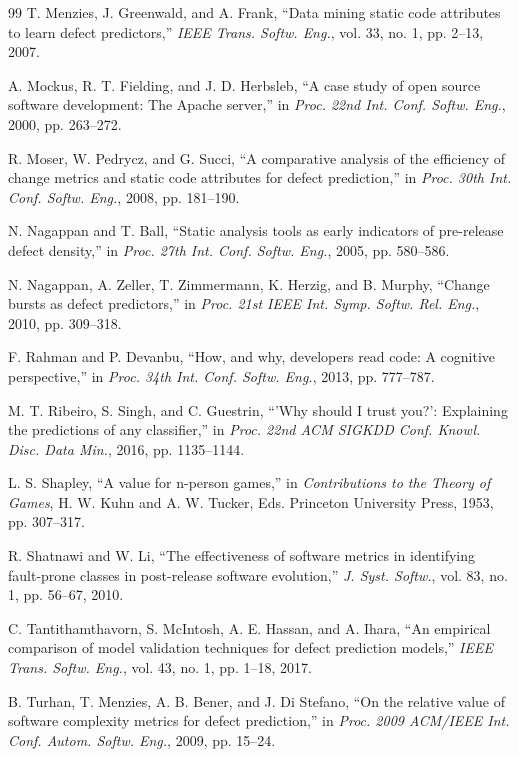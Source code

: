 \documentclass[conference]{IEEEtran}
\begin{document}
\begin{thebibliography}{99}
 T. Menzies, J. Greenwald, and A. Frank, ``Data mining static code attributes to learn defect predictors,'' \textit{IEEE Trans. Softw. Eng.}, vol. 33, no. 1, pp. 2--13, 2007.

 A. Mockus, R. T. Fielding, and J. D. Herbsleb, ``A case study of open source software development: The Apache server,'' in \textit{Proc. 22nd Int. Conf. Softw. Eng.}, 2000, pp. 263--272.

 R. Moser, W. Pedrycz, and G. Succi, ``A comparative analysis of the efficiency of change metrics and static code attributes for defect prediction,'' in \textit{Proc. 30th Int. Conf. Softw. Eng.}, 2008, pp. 181--190.

 N. Nagappan and T. Ball, ``Static analysis tools as early indicators of pre-release defect density,'' in \textit{Proc. 27th Int. Conf. Softw. Eng.}, 2005, pp. 580--586.

 N. Nagappan, A. Zeller, T. Zimmermann, K. Herzig, and B. Murphy, ``Change bursts as defect predictors,'' in \textit{Proc. 21st IEEE Int. Symp. Softw. Rel. Eng.}, 2010, pp. 309--318.

 F. Rahman and P. Devanbu, ``How, and why, developers read code: A cognitive perspective,'' in \textit{Proc. 34th Int. Conf. Softw. Eng.}, 2013, pp. 777--787.

 M. T. Ribeiro, S. Singh, and C. Guestrin, ``'Why should I trust you?': Explaining the predictions of any classifier,'' in \textit{Proc. 22nd ACM SIGKDD Conf. Knowl. Disc. Data Min.}, 2016, pp. 1135--1144.

 L. S. Shapley, ``A value for n-person games,'' in \textit{Contributions to the Theory of Games}, H. W. Kuhn and A. W. Tucker, Eds. Princeton University Press, 1953, pp. 307--317.

 R. Shatnawi and W. Li, ``The effectiveness of software metrics in identifying fault-prone classes in post-release software evolution,'' \textit{J. Syst. Softw.}, vol. 83, no. 1, pp. 56--67, 2010.

 C. Tantithamthavorn, S. McIntosh, A. E. Hassan, and A. Ihara, ``An empirical comparison of model validation techniques for defect prediction models,'' \textit{IEEE Trans. Softw. Eng.}, vol. 43, no. 1, pp. 1--18, 2017.

 B. Turhan, T. Menzies, A. B. Bener, and J. Di Stefano, ``On the relative value of software complexity metrics for defect prediction,'' in \textit{Proc. 2009 ACM/IEEE Int. Conf. Autom. Softw. Eng.}, 2009, pp. 15--24.


\end{thebibliography}
\end{document}
